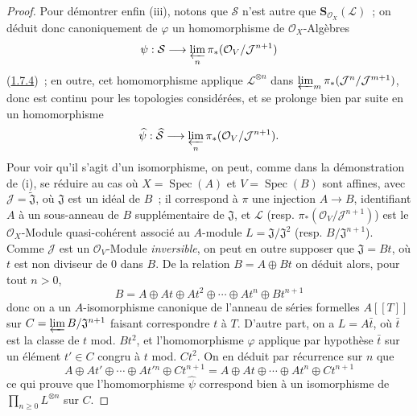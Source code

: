\begin{proof}
Pour démontrer enfin (iii), notons que $\mathcal{S}$ n'est autre que
$\mathbf{S}_{\mathcal{O}_X}(\mathcal{L})$~; on déduit donc canoniquement de
$\varphi$ un homomorphisme de $\mathcal{O}_X$-Algèbres
\[
  \psi:\mathcal{S}\longrightarrow
  \varprojlim_n\pi_*(\mathcal{O}_V/\mathcal{J}^{n+1})
\]
(\hyperref[II.1.7.4-fr]{1.7.4})~; en outre, cet homomorphisme applique
$\mathcal{L}^{\otimes n}$ dans
$\varprojlim_m\pi_*(\mathcal{J}^n/\mathcal{J}^{m+1})$, donc est continu pour
les topologies considérées, et se prolonge bien par suite en un homomorphisme
\[
  \widehat{\psi}:\widehat{\mathcal{S}}\longrightarrow
  \varprojlim_n\pi_*(\mathcal{O}_V/\mathcal{J}^{n+1}).
\]
Pour voir qu'il s'agit d'un isomorphisme, on peut, comme dans la démonstration
de (i), se réduire au cas où $X=\operatorname{Spec}(A)$ et
$V=\operatorname{Spec}(B)$ sont affines, avec
$\mathcal{J}=\widetilde{\mathfrak{J}}$, où $\mathfrak{J}$ est un idéal de
$B$~; il correspond à $\pi$ une injection $A\to B$, identifiant $A$ à un
sous-anneau de $B$ supplémentaire de $\mathfrak{J}$, et $\mathcal{L}$ (resp.
$\pi_*(\mathcal{O}_V/\mathcal{J}^{n+1})$) est le $\mathcal{O}_X$-Module
quasi-cohérent associé au $A$-module $L=\mathfrak{J}/\mathfrak{J}^2$ (resp.
$B/\mathfrak{J}^{n+1}$). Comme $\mathcal{J}$ est un
$\mathcal{O}_V$-Module \emph{inversible}, on peut en outre supposer que
$\mathfrak{J}=Bt$, où $t$ est non diviseur de 0 dans $B$. De la relation
$B=A\oplus Bt$ on déduit alors, pour tout $n>0$,
\[
  B=A\oplus At\oplus At^2\oplus\cdots\oplus At^n\oplus Bt^{n+1}
\]
donc on a un $A$-isomorphisme canonique de l'anneau de séries formelles
$A[[T]]$ sur $C=\varprojlim B/\mathfrak{J}^{n+1}$ faisant correspondre $t$ à
$T$. D'autre part, on a $L=A\bar t$, où $\bar t$ est la classe de $t$
mod. $Bt^2$, et l'homomorphisme $\varphi$ applique par hypothèse $\bar t$ sur
un élément $t'\in C$ congru à $t$ mod. $Ct^2$. On en déduit par récurrence
sur $n$ que
\[
  A\oplus At'\oplus\cdots\oplus At'{}^n\oplus Ct^{n+1}
  =A\oplus At\oplus\cdots\oplus At^n\oplus Ct^{n+1}
\]
ce qui prouve que l'homomorphisme $\widehat{\psi}$ correspond bien à un
isomorphisme de $\prod_{n\geqslant0}L^{\otimes n}$ sur $C$.
\end{proof}

